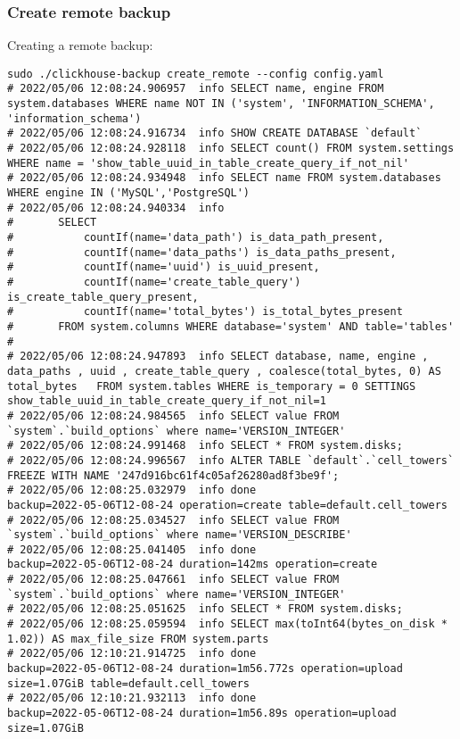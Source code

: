 \subsubsection{Create remote backup}
\label{sec:orga0b4c06}
Creating a remote backup:
\begin{verbatim}
sudo ./clickhouse-backup create_remote --config config.yaml
# 2022/05/06 12:08:24.906957  info SELECT name, engine FROM system.databases WHERE name NOT IN ('system', 'INFORMATION_SCHEMA', 'information_schema')
# 2022/05/06 12:08:24.916734  info SHOW CREATE DATABASE `default`
# 2022/05/06 12:08:24.928118  info SELECT count() FROM system.settings WHERE name = 'show_table_uuid_in_table_create_query_if_not_nil'
# 2022/05/06 12:08:24.934948  info SELECT name FROM system.databases WHERE engine IN ('MySQL','PostgreSQL')
# 2022/05/06 12:08:24.940334  info
# 		SELECT
# 			countIf(name='data_path') is_data_path_present,
# 			countIf(name='data_paths') is_data_paths_present,
# 			countIf(name='uuid') is_uuid_present,
# 			countIf(name='create_table_query') is_create_table_query_present,
# 			countIf(name='total_bytes') is_total_bytes_present
# 		FROM system.columns WHERE database='system' AND table='tables'
#
# 2022/05/06 12:08:24.947893  info SELECT database, name, engine , data_paths , uuid , create_table_query , coalesce(total_bytes, 0) AS total_bytes   FROM system.tables WHERE is_temporary = 0 SETTINGS show_table_uuid_in_table_create_query_if_not_nil=1
# 2022/05/06 12:08:24.984565  info SELECT value FROM `system`.`build_options` where name='VERSION_INTEGER'
# 2022/05/06 12:08:24.991468  info SELECT * FROM system.disks;
# 2022/05/06 12:08:24.996567  info ALTER TABLE `default`.`cell_towers` FREEZE WITH NAME '247d916bc61f4c05af26280ad8f3be9f';
# 2022/05/06 12:08:25.032979  info done                      backup=2022-05-06T12-08-24 operation=create table=default.cell_towers
# 2022/05/06 12:08:25.034527  info SELECT value FROM `system`.`build_options` where name='VERSION_DESCRIBE'
# 2022/05/06 12:08:25.041405  info done                      backup=2022-05-06T12-08-24 duration=142ms operation=create
# 2022/05/06 12:08:25.047661  info SELECT value FROM `system`.`build_options` where name='VERSION_INTEGER'
# 2022/05/06 12:08:25.051625  info SELECT * FROM system.disks;
# 2022/05/06 12:08:25.059594  info SELECT max(toInt64(bytes_on_disk * 1.02)) AS max_file_size FROM system.parts
# 2022/05/06 12:10:21.914725  info done                      backup=2022-05-06T12-08-24 duration=1m56.772s operation=upload size=1.07GiB table=default.cell_towers
# 2022/05/06 12:10:21.932113  info done                      backup=2022-05-06T12-08-24 duration=1m56.89s operation=upload size=1.07GiB
\end{verbatim}

